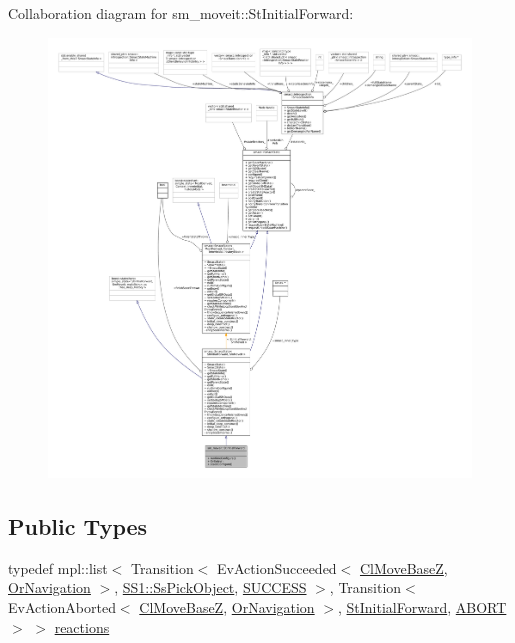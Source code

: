 Collaboration diagram for sm\+\_\+moveit\+:\+:St\+Initial\+Forward\+:
\nopagebreak
\begin{figure}[H]
\begin{center}
\leavevmode
\includegraphics[width=350pt]{structsm__moveit_1_1StInitialForward__coll__graph}
\end{center}
\end{figure}
\subsection*{Public Types}
\begin{DoxyCompactItemize}
\item 
typedef mpl\+::list$<$ Transition$<$ Ev\+Action\+Succeeded$<$ \hyperlink{classcl__move__base__z_1_1ClMoveBaseZ}{Cl\+Move\+BaseZ}, \hyperlink{classsm__moveit_1_1OrNavigation}{Or\+Navigation} $>$, \hyperlink{structsm__moveit_1_1SS1_1_1SsPickObject}{S\+S1\+::\+Ss\+Pick\+Object}, \hyperlink{classSUCCESS}{S\+U\+C\+C\+E\+SS} $>$, Transition$<$ Ev\+Action\+Aborted$<$ \hyperlink{classcl__move__base__z_1_1ClMoveBaseZ}{Cl\+Move\+BaseZ}, \hyperlink{classsm__moveit_1_1OrNavigation}{Or\+Navigation} $>$, \hyperlink{structsm__moveit_1_1StInitialForward}{St\+Initial\+Forward}, \hyperlink{classABORT}{A\+B\+O\+RT} $>$ $>$ \hyperlink{structsm__moveit_1_1StInitialForward_aac76c6ad78e7a30a868d3b984ede9ee2}{reactions}
\end{DoxyCompactItemize}
